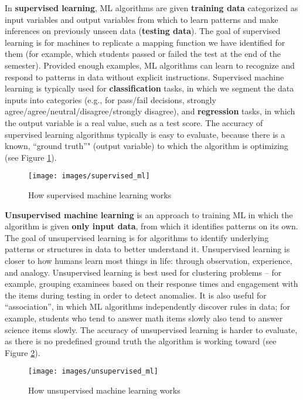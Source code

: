 \documentclass[]{book}
\begin{document}
In \textbf{supervised learning}, ML algorithms are given \textbf{training data} categorized as input variables and output variables from which to learn patterns and make inferences on previously unseen data (\textbf{testing data}). The goal of supervised learning is for machines to replicate a mapping function we have identified for them (for example, which students passed or failed the test at the end of the semester). Provided enough examples, ML algorithms can learn to recognize and respond to patterns in data without explicit instructions. Supervised machine learning is typically used for \textbf{classification} tasks, in which we segment the data inputs into categories (e.g., for pass/fail decisions, strongly agree/agree/neutral/disagree/strongly disagree), and \textbf{regression} tasks, in which the output variable is a real value, such as a test score. The accuracy of supervised learning algorithms typically is easy to evaluate, because there is a known, ``ground truth''" (output variable) to which the algorithm is optimizing (see Figure \ref{fig:fig5-5}).

\begin{figure}
\texttt{[image: images/supervised\_ml]} \caption{How supervised machine learning works}\label{fig:fig5-5}
\end{figure}

\textbf{Unsupervised machine learning} is an approach to training ML in which the algorithm is given \textbf{only input data}, from which it identifies patterns on its own. The goal of unsupervised learning is for algorithms to identify underlying patterns or structures in data to better understand it. Unsupervised learning is closer to how humans learn most things in life: through observation, experience, and analogy. Unsupervised learning is best used for clustering problems -- for example, grouping examinees based on their response times and engagement with the items during testing in order to detect anomalies. It is also useful for ``association'', in which ML algorithms independently discover rules in data; for example, students who tend to answer math items slowly also tend to answer science items slowly. The accuracy of unsupervised learning is harder to evaluate, as there is no predefined ground truth the algorithm is working toward (see Figure \ref{fig:fig5-6}).

\begin{figure}
\texttt{[image: images/unsupervised\_ml]} \caption{How unsupervised machine learning works}\label{fig:fig5-6}
\end{figure}
\end{document}
